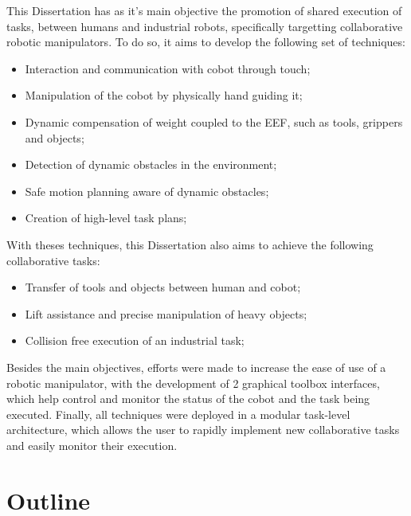 \par This Dissertation has as it's main objective the promotion of shared execution of tasks, between 
humans and industrial robots, specifically targetting collaborative robotic manipulators. To do so, 
it aims to develop the following set of techniques:

\begin{itemize}
    \item Interaction and communication with cobot through touch;
    \item Manipulation of the cobot by physically hand guiding it;
    \item Dynamic compensation of weight coupled to the EEF, such as tools, grippers and objects;
    \item Detection of dynamic obstacles in the environment;
    \item Safe motion planning aware of dynamic obstacles;
    \item Creation of high-level task plans;
\end{itemize}


\par With theses techniques, this Dissertation also aims to achieve the following collaborative tasks:
\begin{itemize}
    \item Transfer of tools and objects between human and cobot;
    \item Lift assistance and precise manipulation of heavy objects;
    \item Collision free execution of an industrial task;
\end{itemize}

\par Besides the main objectives, efforts were made to increase the ease of use of a robotic 
manipulator, with the development of 2 graphical toolbox interfaces, which help control and monitor 
the status of the cobot and the task being executed. Finally, all techniques were deployed in a 
modular task-level architecture, which allows the user to rapidly implement new collaborative 
tasks and easily monitor their execution.

\section{Outline}

